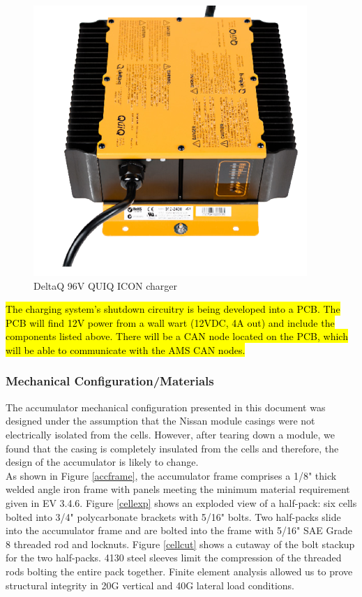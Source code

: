 \documentclass{article}
\DeclareRobustCommand{\hlr}[1]{{\sethlcolor{red}\hl{#1}}}
\begin{document}
            \begin{figure}[H]
                \centering
                \includegraphics[width = 0.5 \textwidth]{chargepic}
                \caption{DeltaQ 96V QUIQ ICON charger}
                \label{chargepic}
            \end{figure}

            \hlr{The charging system's shutdown circuitry is being developed into a PCB. The PCB will find 12V power from a wall wart (12VDC, 4A out) and include the components listed above. There will be a CAN node located on the PCB, which will be able to communicate with the AMS CAN nodes.}

        \subsubsection{Mechanical Configuration/Materials}


            The accumulator mechanical configuration presented in this document was designed under the assumption that the Nissan module casings were not electrically isolated from the cells. However, after tearing down a module, we found that the casing is completely insulated from the cells and therefore, the design of the accumulator is likely to change.\\

            As shown in Figure \ref{accframe}, the accumulator frame comprises a 1/8" thick welded angle iron frame with panels meeting the minimum material requirement given in EV 3.4.6. Figure \ref{cellexp} shows an exploded view of a half-pack: six cells bolted into 3/4" polycarbonate brackets with 5/16" bolts. Two half-packs slide into the accumulator frame and are bolted into the frame with 5/16" SAE Grade 8 threaded rod and locknuts. Figure \ref{cellcut} shows a cutaway of the bolt stackup for the two half-packs. 4130 steel sleeves limit the compression of the threaded rods bolting the entire pack together. Finite element analysis allowed us to prove structural integrity in 20G vertical and 40G lateral load conditions.
\end{document}
